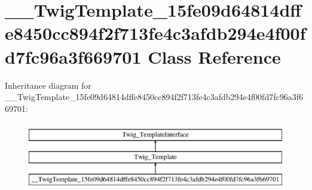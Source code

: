 \hypertarget{class_____twig_template__15fe09d64814dffe8450cc894f2f713fe4c3afdb294e4f00fd7fc96a3f669701}{}\section{\+\_\+\+\_\+\+Twig\+Template\+\_\+15fe09d64814dffe8450cc894f2f713fe4c3afdb294e4f00fd7fc96a3f669701 Class Reference}
\label{class_____twig_template__15fe09d64814dffe8450cc894f2f713fe4c3afdb294e4f00fd7fc96a3f669701}
Inheritance diagram for \+\_\+\+\_\+\+Twig\+Template\+\_\+15fe09d64814dffe8450cc894f2f713fe4c3afdb294e4f00fd7fc96a3f669701\+:\begin{figure}[H]
\begin{center}
\leavevmode
\includegraphics[height=3.000000cm]{class_____twig_template__15fe09d64814dffe8450cc894f2f713fe4c3afdb294e4f00fd7fc96a3f669701}
\end{center}
\end{figure}
